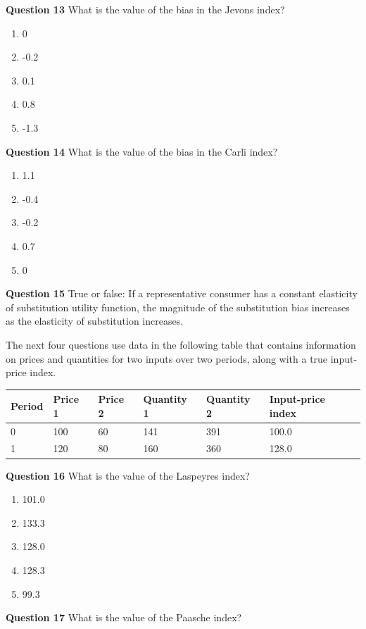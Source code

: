 \documentclass[]{article}
\begin{document}
\textbf{Question 13} What is the value of the bias in the Jevons index?

\begin{enumerate}
\def\labelenumi{\alph{enumi})}
\item
  0
\item
  -0.2
\item
  0.1
\item
  0.8
\item
  -1.3
\end{enumerate}

\textbf{Question 14} What is the value of the bias in the Carli index?

\begin{enumerate}
\def\labelenumi{\alph{enumi})}
\item
  1.1
\item
  -0.4
\item
  -0.2
\item
  0.7
\item
  0
\end{enumerate}

\textbf{Question 15} True or false: If a representative consumer has a constant elasticity of substitution utility function, the magnitude of the substitution bias increases as the elasticity of substitution increases.

The next four questions use data in the following table that contains information on prices and quantities for two inputs over two periods, along with a true input-price index.

\begin{longtable}[]{@{}llllll@{}}
\toprule
Period & Price 1 & Price 2 & Quantity 1 & Quantity 2 & Input-price index\tabularnewline
\midrule
\endhead
0 & 100 & 60 & 141 & 391 & 100.0\tabularnewline
1 & 120 & 80 & 160 & 360 & 128.0\tabularnewline
\bottomrule
\end{longtable}

\textbf{Question 16} What is the value of the Laspeyres index?

\begin{enumerate}
\def\labelenumi{\alph{enumi})}
\item
  101.0
\item
  133.3
\item
  128.0
\item
  128.3
\item
  99.3
\end{enumerate}

\textbf{Question 17} What is the value of the Paasche index?
\end{document}
